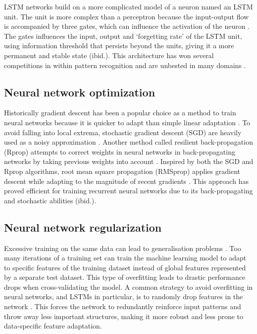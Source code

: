 \documentclass{llncs}
\begin{document}
LSTM networks build on a more complicated model of a neuron named an LSTM unit. The unit is more complex than a perceptron because the input-output flow is accompanied by three gates, which can influence the activation of the neuron \cite{schmidhuber1997, schmidhuber2015}. The gates influences the input, output and ‘forgetting rate’ of the LSTM unit, using information threshold that persists beyond the units, giving it a more permanent and stable state (ibid.). This architecture has won several competitions in
within pattern recognition and are unbested in many domains \cite{schmidhuber2015}.

\subsection{Neural network optimization}
Historically gradient descent has been a popular choice as a method to train neural networks because it is quicker to adapt than simple linear adaptation \cite{russel2014} \cite{nilsson2009}. To avoid falling into local extrema, stochastic gradient descent (SGD) are heavily used as a noisy approximation \cite{russel2014}. Another method called resilient back-propagation (Rprop) attempts to correct weights in neural networks in back-propagating networks by taking previous weights into account \cite{nilsson2009}. Inspired by both the SGD and Rprop algorithms, root mean square propagation (RMSprop) applies gradient descent while adapting to the magnitude of recent gradients \cite{tieleman2012}. This approach has proved efficient for training recurrent neural networks due to its back-propagating and stochastic abilities (ibid.).

\subsection{Neural network regularization}
Excessive training on the same data can lead to generalisation problems \cite{russel2014}. Too many iterations of a training set can train the machine learning model to adapt to specific features of the training dataset instead of global features represented by a separate test dataset. This type of overfitting leads to drastic performance drops when cross-validating the model. A common strategy to avoid overfitting in neural networks, and LSTMs in particular, is to randomly drop features in the network \cite{russel2014}. This forces the network to redundantly reinforce input patterns and throw away less important structures, making it more robust and less prone to data-specific feature adaptation.
\end{document}
